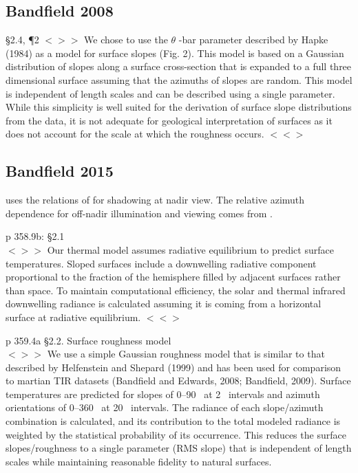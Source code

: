 \documentclass{article}
\newcommand{\bq}{$ < \! > \!   \! >$ } %
\newcommand{\eq}{ $< \! \! < \! > $ } %
\begin{document}
\subsection{Bandfield 2008} %
\S 2.4, \P 2 \bq We chose to use the $\theta$ -bar parameter described by Hapke
(1984) as a model for surface slopes (Fig. 2). This model is based on a Gaussian
distribution of slopes along a surface cross-section that is expanded to a full
three dimensional surface assuming that the azimuths of slopes are random. This
model is independent of length scales and can be described using a single
parameter. While this simplicity is well suited for the derivation of surface
slope distributions from the data, it is not adequate for geological
interpretation of surfaces as it does not account for the scale at which the
roughness occurs. \eq

\subsection{Bandfield 2015} %
 uses the relations of  for shadowing at nadir
view. The relative azimuth dependence for off-nadir illumination and viewing comes from .

p 358.9b: \S 2.1 \\ 
\bq Our thermal model assumes radiative equilibrium to predict surface
temperatures. Sloped surfaces include a downwelling radiative component
proportional to the fraction of the hemisphere filled by adjacent surfaces
rather than space. To maintain computational efficiency, the solar and thermal
infrared downwelling radiance is calculated assuming it is coming from a
horizontal surface at radiative equilibrium. \eq

p 359.4a \S 2.2. Surface roughness model \\ 
\bq We use a simple Gaussian roughness model
that is similar to that described by Helfenstein and Shepard (1999) and has been
used for comparison to martian TIR datasets (Bandfield and Edwards, 2008;
Bandfield, 2009). Surface temperatures are predicted for slopes of 0–90\qd~ at
2\qd~ intervals and azimuth orientations of 0–360\qd~ at 20\qd~ intervals. The
radiance of each slope/azimuth combination is calculated, and its contribution
to the total modeled radiance is weighted by the statistical probability of its
occurrence. This reduces the surface slopes/roughness to a single parameter (RMS
slope) that is independent of length scales while maintaining reasonable
fidelity to natural surfaces.
\end{document}

